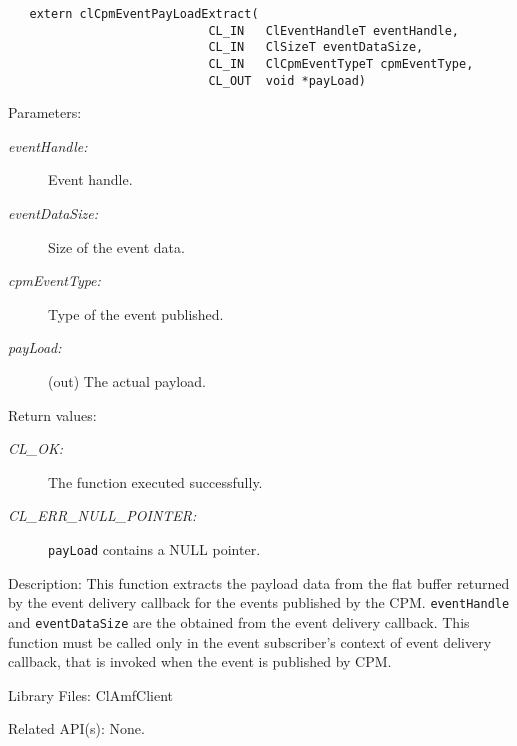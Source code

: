 {\begin{Desc}
\footnotesize\begin{verbatim}   extern clCpmEventPayLoadExtract(
              				CL_IN   ClEventHandleT eventHandle, 
              				CL_IN   ClSizeT eventDataSize, 
              				CL_IN   ClCpmEventTypeT cpmEventType, 
              				CL_OUT  void *payLoad)
\end{verbatim}
\normalsize
\end{Desc}
\begin{Desc}
\item[Parameters:]
\begin{description}
\item[{\em event\-Handle:}]Event handle. \item[{\em event\-Data\-Size:}]Size of the event data. \item[{\em cpm\-Event\-Type:}]Type of the event published. \item[{\em pay\-Load:}](out) The actual payload.\end{description}
\end{Desc}
\begin{Desc}
\item[Return values:]
\begin{description}
\item[{\em CL\_\-OK:}]The function executed successfully. \item[{\em CL\_\-ERR\_\-NULL\_\-POINTER:}]{\tt{payLoad}} contains a NULL pointer.\end{description}
\end{Desc}
\begin{Desc}
\item[Description:]This function extracts the payload data from the flat buffer returned by the event delivery callback for the events published by the 
CPM. {\tt{event\-Handle}} and {\tt{event\-Data\-Size}} are the obtained from the event delivery callback. This function must be called only in the event 
subscriber's context of event delivery callback, that is invoked when the event is published by CPM.\end{Desc}
\begin{Desc}
\item[Library Files:]Cl\-Amf\-Client\end{Desc}

\begin{Desc}
\item[Related API(s):]None. \end{Desc}
\newpage




}
